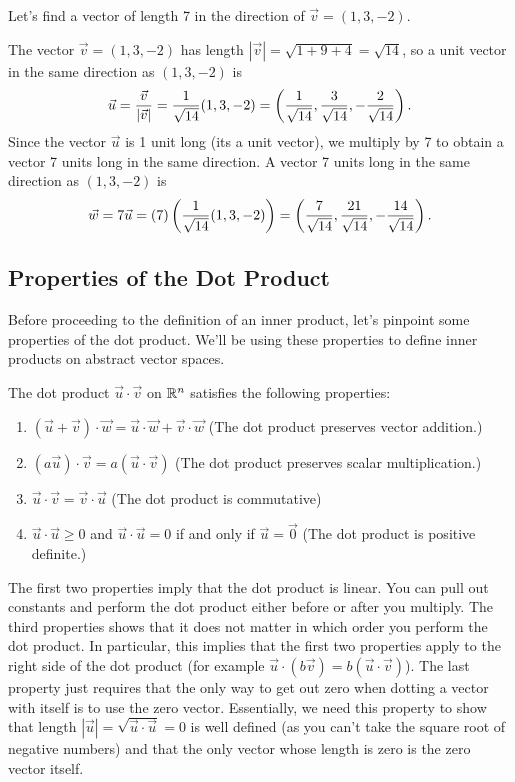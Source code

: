 \begin{example}
Let's find a vector of length 7 in the direction of $\vec v = (1,3,-2)$.  

The vector $\vec v = (1,3,-2)$ has length $|\vec v|=\sqrt{1+9+4}=\sqrt{14}$, so a unit vector in the same direction as $(1,3,-2)$ is 
$$\vec u = \frac{\vec v}{|\vec v|}=
\displaystyle\frac{1}{\sqrt{14}}(1,3,-2) 
= \left(\frac{1}{\sqrt{14}},\frac{3}{\sqrt{14}},-\frac{2}{\sqrt{14}}\right).$$
Since the vector $\vec u$ is 1 unit long (its a unit vector), we multiply by 7 to obtain a vector 7 units long in the same direction.  
A vector 7 units long in the same direction as $(1,3,-2)$ is
$$\vec w = 7\vec u = (7)\left(\displaystyle\frac{1}{\sqrt{14}}(1,3,-2)\right) = \left(\frac{7}{\sqrt{14}},\frac{21}{\sqrt{14}},-\frac{14}{\sqrt{14}}\right).$$  
\end{example}

\subsection{Properties of the Dot Product}

Before proceeding to the definition of an inner product, let's pinpoint some properties of the dot product. We'll be using these properties to define inner products on abstract vector spaces. 

\begin{theorem}
The dot product $\vec u \cdot \vec v$ on $\mathbb{R}^n$ satisfies the following properties:
\begin{enumerate}
\item $(\vec u +\vec v)\cdot \vec w = \vec u\cdot \vec w + \vec v\cdot \vec w$ (The dot product preserves vector addition.)
\item $(a\vec u)\cdot \vec v = a(\vec u\cdot \vec v)$ (The dot product preserves scalar multiplication.)
\item $\vec u\cdot \vec v = \vec v\cdot \vec u$ (The dot product is commutative) 
\item $\vec u\cdot \vec u \geq 0$ and $\vec u\cdot\vec u=0$ if and only if $\vec u =\vec 0$ (The dot product is positive definite.)
\end{enumerate}
\end{theorem}

The first two properties imply that the dot product is linear. You can pull out constants and perform the dot product either before or after you multiply.  The third properties shows that it does not matter in which order you perform the dot product. In particular, this implies that the first two properties apply to the right side of the dot product (for example $\vec u \cdot (b\vec v) = b(\vec u \cdot \vec v)$).  The last property just requires that the only way to get out zero when dotting a vector with itself is to use the zero vector. Essentially, we need this property to show that length $|\vec u| =\sqrt{\vec u\cdot \vec u} = 0$ is well defined (as you can't take the square root of negative numbers) and that the only vector whose length is zero is the zero vector itself.

